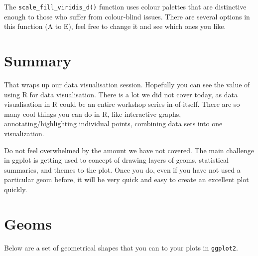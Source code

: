 \documentclass[
]{book}
\begin{document}
The \texttt{scale\_fill\_viridis\_d()} function uses colour palettes that are distinctive enough to those who suffer from colour-blind issues. There are several options in this function (A to E), feel free to change it and see which ones you like.

\section{Summary}\label{summary-4}

That wraps up our data visualisation session. Hopefully you can see the value of using R for data visualisation. There is a lot we did not cover today, as data visualisation in R could be an entire workshop series in-of-itself. There are so many cool things you can do in R, like interactive graphs, annotating/highlighting individual points, combining data sets into one visualization.

Do not feel overwhelmed by the amount we have not covered. The main challenge in ggplot is getting used to concept of drawing layers of geoms, statistical summaries, and themes to the plot. Once you do, even if you have not used a particular geom before, it will be very quick and easy to create an excellent plot quickly.

\section{Geoms}\label{geoms}

Below are a set of geometrical shapes that you can to your plots in \texttt{ggplot2}.
\end{document}

